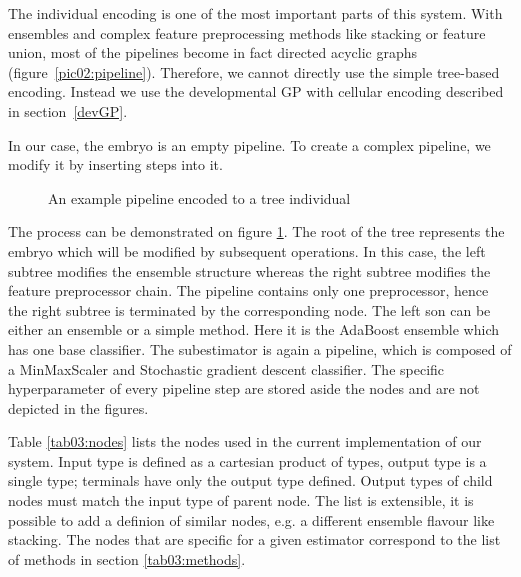 The individual encoding is one of the most important parts of this system. With
ensembles and complex feature preprocessing methods like stacking or feature
union, most of the pipelines become in fact directed acyclic graphs (figure~\ref{pic02:pipeline}). Therefore, we cannot directly use the simple tree-based
encoding. Instead we use the developmental GP with cellular encoding described
in section~\ref{devGP}.

In our case, the embryo is an empty pipeline. To create a complex pipeline, we
modify it by inserting steps into it.

\begin{figure}[ht]\centering
    \qquad
    \caption{An example pipeline encoded to a tree individual}%
    \label{pic:pipeencoding}%
\end{figure}

The process can be demonstrated on figure
\ref{pic:pipeencoding}. The root of the tree represents the embryo which will
be modified by subsequent operations. In this case, the left subtree modifies
the ensemble structure whereas the right subtree modifies the feature
preprocessor chain. The pipeline contains only one preprocessor, hence the
right subtree is terminated by the corresponding node. The left son can be
either an ensemble or a simple method. Here it is the AdaBoost ensemble which
has one base classifier. The subestimator is again a pipeline, which is composed
of a MinMaxScaler and Stochastic gradient descent classifier. The specific
hyperparameter of every pipeline step are stored aside the nodes and are not
depicted in the figures.

Table \ref{tab03:nodes} lists the nodes used in the current implementation of
our system. Input type is defined as a cartesian product of types, output type
is a single type; terminals have only the output type defined. Output types of
child nodes must match the input type of parent node. The list is extensible,
it is possible to add a definion of similar nodes, e.g. a different ensemble
flavour like stacking. The nodes that are specific for a given estimator
correspond to the list of methods in section \ref{tab03:methods}.

